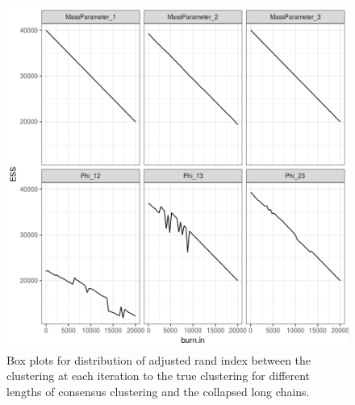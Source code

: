 \documentclass[12pt]{article} %
\begin{document}
\newpage

\begin{figure}[h]
	\centering
	\includegraphics[scale=0.65]{Images/Gen_data/Case_1/Esimated_burn_in_plot_4.png}
	\caption{Box plots for distribution of adjusted rand index between the clustering at each iteration to the true clustering for different lengths of consensus clustering and the collapsed long chains.}
	\label{fig:case_1_esimated_burn_in_plot_4}
\end{figure}

\newpage
\end{document}
